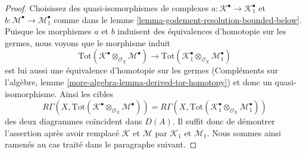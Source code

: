 \begin{proof}

Choisissez des quasi-isomorphismes de complexes
$a : \mathcal{K}^\bullet \to \mathcal{K}_1^\bullet$ et
$b : \mathcal{M}^\bullet \to \mathcal{M}_1^\bullet$
comme dans le lemme \ref{lemma-godement-resolution-bounded-below}. Puisque les morphismes $a$ et $b$ induisent des équivalences d'homotopie sur les germes, nous voyons que le morphisme induit
$$
\text{Tot}(\mathcal{K}^\bullet \otimes_{\mathcal{O}_X} \mathcal{M}^\bullet)
\to
\text{Tot}(\mathcal{K}_1^\bullet \otimes_{\mathcal{O}_X} \mathcal{M}_1^\bullet)
$$
est lui aussi une équivalence d'homotopie sur les germes (Compléments sur l'algèbre, lemme
\ref{more-algebra-lemma-derived-tor-homotopy}) et donc un quasi-isomorphisme. Ainsi les cibles
$$
R\Gamma(X,
\text{Tot}(\mathcal{K}^\bullet
\otimes_{\mathcal{O}_X} \mathcal{M}^\bullet)) =
R\Gamma(X,
\text{Tot}(\mathcal{K}_1^\bullet
\otimes_{\mathcal{O}_X} \mathcal{M}_1^\bullet))
$$
des deux diagrammes coïncident dans $D(A)$. Il suffit donc de démontrer l'assertion après avoir remplacé $\mathcal{K}$ et $\mathcal{M}$
par $\mathcal{K}_1$ et $\mathcal{M}_1$. Nous sommes ainsi ramenés au cas traité dans le paragraphe suivant.

\medskip\noindent


\end{proof}
